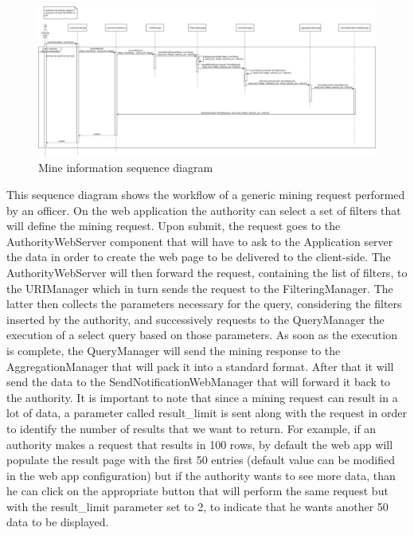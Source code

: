 \begin{figure}[H]
  \centering
  \includegraphics[width=1\textwidth]{Images/UML_diagrams/Sequence_Diagrams/Mine_information_sd.png}
  \caption{Mine information sequence diagram}
  \label{fig:mine_info_sd}
\end{figure}
This sequence diagram shows the workflow of a generic mining request performed by an officer. On the web application the authority can select a set of filters that will define the mining request. Upon submit, the request goes to the AuthorityWebServer component that will have to ask to the Application server the data in order to create the web page to be delivered to the client-side. The AuthorityWebServer will then forward the request, containing the list of filters, to the URIManager which in turn sends the request to the FilteringManager. The latter then collects the parameters necessary for the query, considering the filters inserted by the authority, and successively requests to the QueryManager the execution of a select query based on those parameters. As soon as the execution is complete, the QueryManager will send the mining response to the AggregationManager that will pack it into a standard format. After that it will send the data to the SendNotificationWebManager that will forward it back to the authority. It is important to note that since a mining request can result in a lot of data, a parameter called result\_limit is sent along with the request in order to identify the number of results that we want to return. For example, if an authority makes a request that results in 100 rows, by default the web app will populate the result page with the first 50 entries (default value can be modified in the web app configuration) but if the authority wants to see more data, than he can click on the appropriate button that will perform the same request but with the result\_limit parameter set to 2, to indicate that he wants another 50 data to be displayed. 
